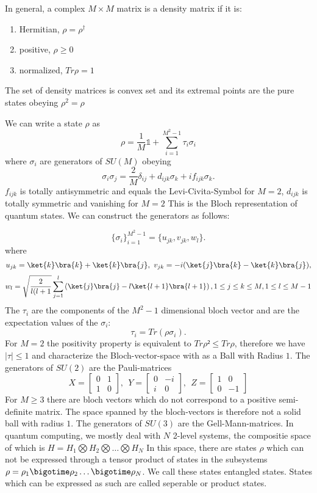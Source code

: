 In general, a complex $M \times M$ matrix is a density matrix if it is:
\begin{enumerate}[label=(\roman*)]
	\item Hermitian,	$\rho =\rho^{\dagger}$
	\item positive,		$\rho \ge 0$
	\item normalized,	$Tr\rho = 1$
\end{enumerate}
The set of density matrices is convex set and its extremal points are the pure states obeying $\rho^2 = \rho$

We can write a state $\rho$ as
$$\rho = \frac{1}{M} \mathbb{1} + \sum_{i=1}^{M^2-1} \tau_i \sigma_i$$
where $\sigma_i$ are generators of $SU(M)$ obeying
\[
	\sigma_i\sigma_j = \frac{2}{M}\delta_{ij} + d_{ijk}\sigma_k + if_{ijk}\sigma_k
.\]
$f_{ijk}$ is totally antisymmetric and equals the Levi-Civita-Symbol for $M=2$, $d_{ijk}$ is totally symmetric and vanishing for $M=2$
This is the Bloch representation of quantum states.
We can construct the generators as follows:

 \[
\{\sigma_i\}^{M^2-1}_{i=1} = \{u_{jk},v_{jk},w_l\}
.\]
where
$$
	u_{jk} = \ket{k}\bra{k}+\ket{k}\bra{j}, ~ v_{jk} = -i(\ket{j}\bra{k}-\ket{k}\bra{j}),
$$
$$
	w_l = \sqrt{\frac{2}{l(l+1}} \sum_{j=1}^{l} \left( \ket{j}\bra{j}-l\ket{l+1}\bra{l+1} \right),
	1\le j\le k\le M, 1\le l\le M-1
$$ \cite{kimura03}
The $\tau_i$ are the components of the $M^2-1$ dimensional bloch vector and are the expectation values of the $\sigma_i$:
 \[
	 \tau_i = Tr(\rho\sigma_i)
.\]
For $M=2$ the positivity property is equivalent to $Tr\rho²\le Tr\rho$, therefore we have $|\tau|\le 1$ and characterize the Bloch-vector-space with as a Ball with Radius $1$.
The generators of $SU(2)$ are the Pauli-matrices
  $$
 X = \begin{bmatrix} 0 & 1 \\
                    1 & 0
        \end{bmatrix},~

    ~Y = \begin{bmatrix} 0 & -i \\
                    i & 0
         \end{bmatrix},~

    ~Z = \begin{bmatrix} 1 & 0 \\
                    0 & -1
        \end{bmatrix}
$$
For $M\ge3$ there are bloch vectors which do not correspond to a positive semi-definite matrix.
The space spanned by the bloch-vectors is therefore not a solid ball with radius $1$.
The generators of  $SU(3)$ are the Gell-Mann-matrices.  
In quantum computing, we mostly deal with $N$ 2-level systems, the compositie space of which is $H = H_1 \bigotimes H_2 \bigotimes \ldots \bigotimes H_N$
In this space, there are states $\rho$ which can not be expressed through a tensor product of states in the subsystems $\rho = \rho_1\bigotime\rho_2\ldots\bigotime\rho_N$.
We call these states entangled states.
States which can be expressed as such are called seperable or product states.
